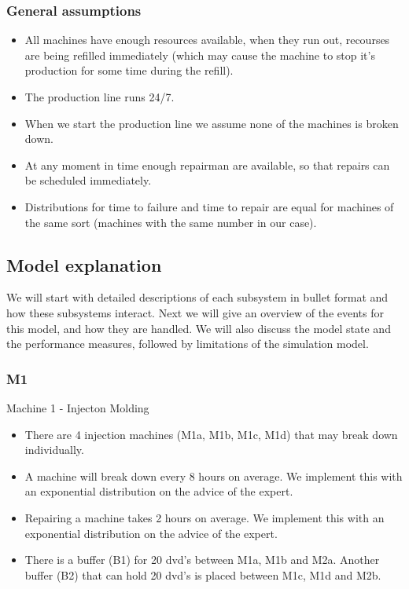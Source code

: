 \documentclass[11pt,a4paper]{article}
\begin{document}
\subsubsection{General assumptions}
\begin{itemize}
\item All machines have enough resources available, when they run out, recourses are being refilled immediately (which may cause the machine to stop it's production for some time during the refill).
\item The production line runs 24/7.
\item When we start the production line we assume none of the machines is broken down.
\item At any moment in time enough repairman are available, so that repairs can be scheduled immediately. 
\item Distributions for time to failure and time to repair are equal for machines of the same sort (machines with the same number in our case).
\end{itemize}


\subsection{Model explanation}
We will start with detailed descriptions of each subsystem in bullet format and how these subsystems interact. Next we will give an overview of the events for this model, and how they are handled. We will also discuss the model state and the performance measures, followed by limitations of the simulation model. 

\subsubsection{M1}
Machine 1 - Injecton Molding
\begin{itemize}
\item There are 4 injection machines (M1a, M1b, M1c, M1d)  that may break down individually. 
\item  A machine will break down every 8 hours on average. We implement this with an exponential distribution on the advice of the expert. 
\item  Repairing a machine takes 2 hours on average. We implement this with an exponential distribution on the advice of the expert. 
\item  There is a buffer (B1) for 20 dvd's between M1a, M1b and M2a. Another buffer (B2) that can hold 20 dvd's is placed between M1c, M1d and M2b. 
\end{itemize}
\end{document}

